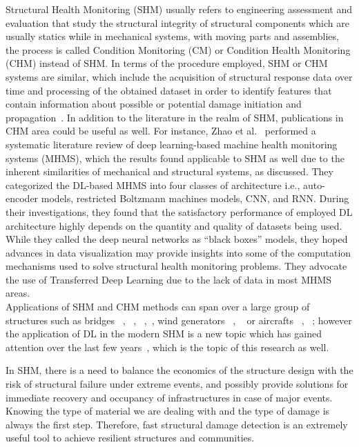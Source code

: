 \documentclass[10pt,twocolumn,letterpaper]{article}
\begin{document}
Structural Health Monitoring (SHM) usually refers to engineering assessment and evaluation that study the structural integrity of structural components which are usually statics while in mechanical systems, with moving parts and assemblies, the process is called Condition Monitoring (CM) or Condition Health Monitoring (CHM) instead of SHM. In terms of the procedure employed, SHM or CHM systems are similar, which include the acquisition of structural response data over time and processing of the obtained dataset in order to identify features that contain information about possible or potential damage initiation and propagation~\cite{Seventekidis01}. In addition to the literature in the realm of SHM, publications in CHM area could be useful as well. For instance, Zhao et al.~\cite{Zhao01} performed a systematic literature review of deep learning-based machine health monitoring systems (MHMS), which the results found applicable to SHM as well due to the inherent similarities of mechanical and structural systems, as discussed. They categorized the DL-based MHMS into four classes of architecture i.e., auto-encoder models, restricted Boltzmann machines models, CNN, and RNN. During their investigations, they found that the satisfactory performance of employed DL architecture highly depends on the quantity and quality of datasets being used. While they called the deep neural networks as “black boxes” models, they hoped advances in data visualization may provide insights into some of the computation mechanisms used to solve structural health monitoring problems. They advocate the use of Transferred Deep Learning due to the lack of data in most MHMS areas. 
\\
Applications of SHM and CHM methods can span over a large group of structures such as bridges~\cite{Tome01} , ~\cite{Wickramasinghe01},~\cite{Yapar01} ,~\cite{Dohler01}, wind generators ~\cite{Garcia01}, ~\cite{Tcherniak01} or aircrafts ~\cite{Elasha01}, ~\cite{Ksica01}; however the application of DL in the modern SHM is a new topic which has gained attention over the last few years~\cite{Seventekidis01}, which is the topic of this research as well.

In SHM, there is a need to balance the economics of the structure design with the risk of structural failure under extreme events, and possibly provide solutions for immediate recovery and occupancy of infrastructures in case of major events.  Knowing the type of material we are dealing with and the type of damage is always the first step. Therefore, fast structural damage detection is an extremely useful tool to achieve resilient structures and communities. 
\end{document}
